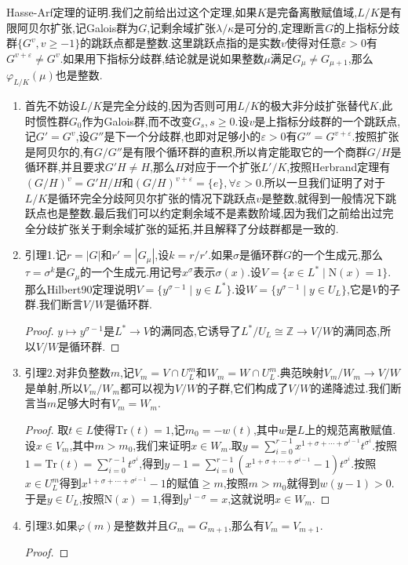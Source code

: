 Hasse-Arf定理的证明.我们之前给出过这个定理,如果$K$是完备离散赋值域,$L/K$是有限阿贝尔扩张,记Galois群为$G$,记剩余域扩张$\lambda/\kappa$是可分的,定理断言$G$的上指标分歧群$\{G^v,v\ge-1\}$的跳跃点都是整数.这里跳跃点指的是实数$v$使得对任意$\varepsilon>0$有$G^{v+\varepsilon}\not=G^v$.如果用下指标分歧群,结论就是说如果整数$\mu$满足$G_{\mu}\not=G_{\mu+1}$,那么$\varphi_{L/K}(\mu)$也是整数.
\begin{enumerate}
	\item 首先不妨设$L/K$是完全分歧的,因为否则可用$L/K$的极大非分歧扩张替代$K$,此时惯性群$G_0$作为Galois群,而不改变$G_s,s\ge0$.设$v$是上指标分歧群的一个跳跃点,记$G'=G^v$,设$G''$是下一个分歧群,也即对足够小的$\varepsilon>0$有$G''=G^{v+\varepsilon}$.按照扩张是阿贝尔的,有$G/G''$是有限个循环群的直积,所以肯定能取它的一个商群$G/H$是循环群,并且要求$G'H\not=H$,那么$H$对应于一个扩张$L'/K$,按照Herbrand定理有$(G/H)^v=G'H/H$和$(G/H)^{v+\varepsilon}=\{e\},\forall\varepsilon>0$.所以一旦我们证明了对于$L/K$是循环完全分歧阿贝尔扩张的情况下跳跃点$v$是整数,就得到一般情况下跳跃点也是整数.最后我们可以约定剩余域不是素数阶域,因为我们之前给出过完全分歧扩张关于剩余域扩张的延拓,并且解释了分歧群都是一致的.
	\item 引理1.记$r=|G|$和$r'=|G_{\mu}|$,设$k=r/r'$.如果$\sigma$是循环群$G$的一个生成元,那么$\tau=\sigma^k$是$G_{\mu}$的一个生成元.用记号$x^{\sigma}$表示$\sigma(x)$.设$V=\{x\in L^*\mid\mathrm{N}(x)=1\}$.那么Hilbert90定理说明$V=\{y^{\sigma-1}\mid y\in L^*\}$.设$W=\{y^{\sigma-1}\mid y\in U_L\}$,它是$V$的子群.我们断言$V/W$是循环群.
	\begin{proof}
		
		$y\mapsto y^{\sigma-1}$是$L^*\to V$的满同态,它诱导了$L^*/U_L\cong\mathbb{Z}\to V/W$的满同态,所以$V/W$是循环群.
	\end{proof}
    \item 引理2.对非负整数$m$,记$V_m=V\cap U_L^m$和$W_m=W\cap U_L^m$.典范映射$V_m/W_m\to V/W$是单射,所以$V_m/W_m$都可以视为$V/W$的子群,它们构成了$V/W$的递降滤过.我们断言当$m$足够大时有$V_m=W_m$.
    \begin{proof}
    	
    	取$t\in L$使得$\mathrm{Tr}(t)=1$,记$m_0=-w(t)$,其中$w$是$L$上的规范离散赋值.设$x\in V_m$,其中$m>m_0$,我们来证明$x\in W_m$.取$y=\sum_{i=0}^{r-1}x^{1+\sigma+\cdots+\sigma^{i-1}}t^{\sigma^i}$.按照$1=\mathrm{Tr}(t)=\sum_{i=0}^{r-1}t^{\sigma^i}$,得到$y-1=\sum_{i=0}^{r-1}(x^{1+\sigma+\cdots+\sigma^{i-1}}-1)t^{\sigma^i}$.按照$x\in U_L^m$得到$x^{1+\sigma+\cdots+\sigma^{i-1}}-1$的赋值$\ge m$,按照$m>m_0$就得到$w(y-1)>0$.于是$y\in U_L$,按照$\mathrm{N}(x)=1$,得到$y^{1-\sigma}=x$,这就说明$x\in W_m$.
    \end{proof}
    \item 引理3.如果$\varphi(m)$是整数并且$G_m=G_{m+1}$,那么有$V_m=V_{m+1}$.
    \begin{proof}
    	

\end{proof}
\end{enumerate}
